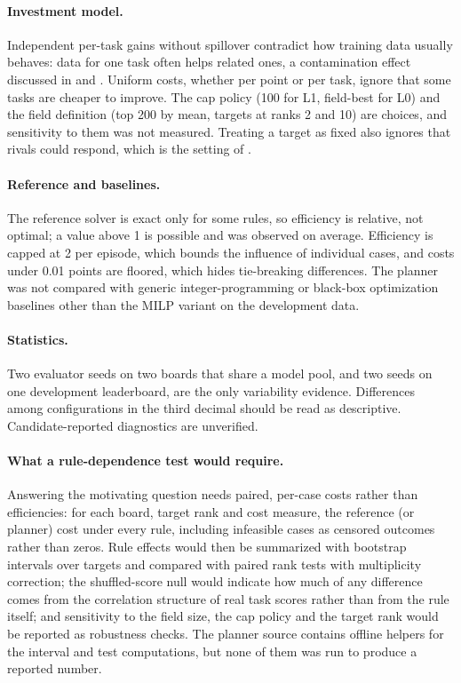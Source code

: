 \documentclass{article}
\begin{document}
\paragraph{Investment model.} Independent per-task gains without spillover contradict how training data usually behaves: data for one task often helps related ones, a contamination effect discussed in \citet{Zhou2023DontMY} and \citet{Sainz2023NLPEI}. Uniform costs, whether per point or per task, ignore that some tasks are cheaper to improve. The cap policy (100 for L1, field-best for L0) and the field definition (top 200 by mean, targets at ranks 2 and 10) are choices, and sensitivity to them was not measured. Treating a target as fixed also ignores that rivals could respond, which is the setting of \citet{Chen2026LeaderboardIM}.

\paragraph{Reference and baselines.} The reference solver is exact only for some rules, so efficiency is relative, not optimal; a value above 1 is possible and was observed on average. Efficiency is capped at 2 per episode, which bounds the influence of individual cases, and costs under 0.01 points are floored, which hides tie-breaking differences. The planner was not compared with generic integer-programming or black-box optimization baselines other than the MILP variant on the development data.

\paragraph{Statistics.} Two evaluator seeds on two boards that share a model pool, and two seeds on one development leaderboard, are the only variability evidence. Differences among configurations in the third decimal should be read as descriptive. Candidate-reported diagnostics are unverified.

\paragraph{What a rule-dependence test would require.} Answering the motivating question needs paired, per-case costs rather than efficiencies: for each board, target rank and cost measure, the reference (or planner) cost under every rule, including infeasible cases as censored outcomes rather than zeros. Rule effects would then be summarized with bootstrap intervals over targets and compared with paired rank tests with multiplicity correction; the shuffled-score null would indicate how much of any difference comes from the correlation structure of real task scores rather than from the rule itself; and sensitivity to the field size, the cap policy and the target rank would be reported as robustness checks. The planner source contains offline helpers for the interval and test computations, but none of them was run to produce a reported number.
\end{document}
